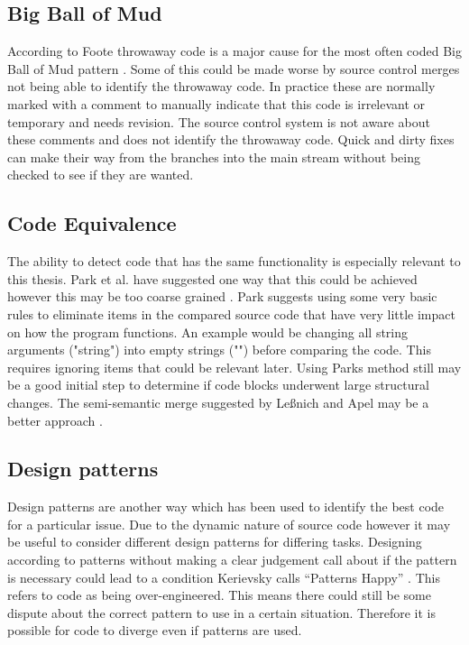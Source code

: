 \documentclass[12pt]{CRPITStyle}
\renewcommand{\cite}{\citep}
\begin{document}
\subsection{Big Ball of Mud}
According to Foote throwaway code is a major cause for the most often coded Big Ball of Mud pattern \cite{Foote1997}. Some of this could be made worse by source control merges not being able to identify the throwaway code. In practice these are normally marked with a comment to manually indicate that this code is irrelevant or temporary and needs revision. The source control system is not aware about these comments and does not identify the throwaway code. Quick and dirty fixes can make their way from the branches into the main stream without being checked to see if they are wanted.
\subsection{Code Equivalence}
The ability to detect code that has the same functionality is especially relevant to this thesis. Park et al. have suggested one way that this could be achieved however this may be too coarse grained \cite{Park2013}. Park suggests using some very basic rules to eliminate items in the compared source code that have very little impact on how the program functions. An example would be changing all string arguments ("string") into empty strings ("") before comparing the code. This requires ignoring items that could be relevant later. Using Parks method still may be a good initial step to determine if code blocks underwent large structural changes. The semi-semantic merge suggested by Le{\ss}nich and Apel may be a better approach \cite{LeBenich2012} \cite{Apel2011}.
\subsection{Design patterns}
Design patterns are another way which has been used to identify the best code for a particular issue. Due to the dynamic nature of source code however it may be useful to consider different design patterns for differing tasks. Designing according to patterns without making a clear judgement call about if the pattern is necessary could lead to a condition Kerievsky calls ``Patterns Happy'' \cite{Kerievsky2004}. This refers to code as being over-engineered. This means there could still be some dispute about the correct pattern to use in a certain situation. Therefore it is possible for code to diverge even if patterns are used.
\end{document}
